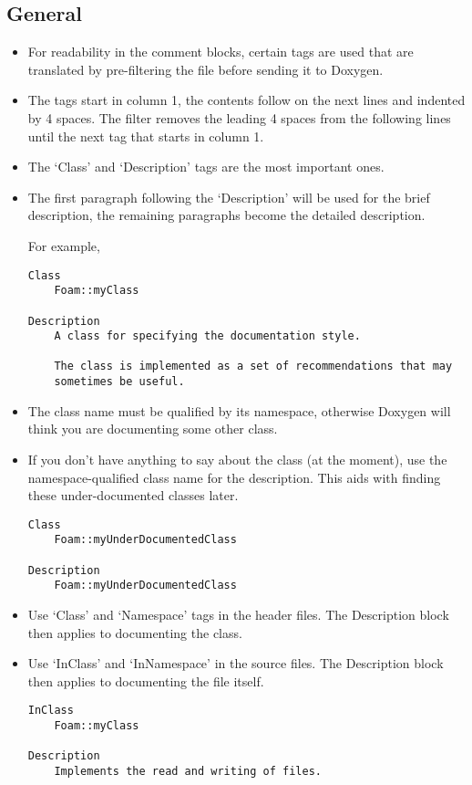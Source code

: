 \documentclass[11pt]{article}
\begin{document}
\subsection{General}
\label{sec-1-11}

\begin{itemize}
\item For readability in the comment blocks, certain tags are used that are
      translated by pre-filtering the file before sending it to Doxygen.
\item The tags start in column 1, the contents follow on the next lines and
      indented by 4 spaces. The filter removes the leading 4 spaces from the
      following lines until the next tag that starts in column 1.
\item The `Class' and `Description' tags are the most important ones.
\item The first paragraph following the `Description' will be used for the
      brief description, the remaining paragraphs become the detailed
      description.

      For example,

\begin{verbatim}
Class
    Foam::myClass

Description
    A class for specifying the documentation style.

    The class is implemented as a set of recommendations that may
    sometimes be useful.
\end{verbatim}
\item The class name must be qualified by its namespace, otherwise Doxygen
      will think you are documenting some other class.
\item If you don't have anything to say about the class (at the moment), use
      the namespace-qualified class name for the description. This aids with
      finding these under-documented classes later.

\begin{verbatim}
Class
    Foam::myUnderDocumentedClass

Description
    Foam::myUnderDocumentedClass
\end{verbatim}
\item Use `Class' and `Namespace' tags in the header files.
      The Description block then applies to documenting the class.
\item Use `InClass' and `InNamespace' in the source files.
      The Description block then applies to documenting the file itself.

\begin{verbatim}
InClass
    Foam::myClass

Description
    Implements the read and writing of files.
\end{verbatim}
\end{itemize}
\end{document}
